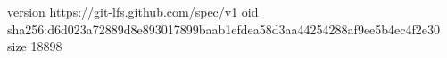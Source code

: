 version https://git-lfs.github.com/spec/v1
oid sha256:d6d023a72889d8e893017899baab1efdea58d3aa44254288af9ee5b4ec4f2e30
size 18898
